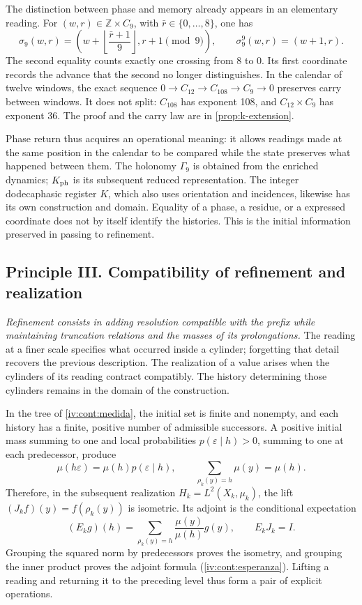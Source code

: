 The distinction between phase and memory already appears in an elementary reading.
For \((w,r)\in\mathbb Z\times C_9\), with
\(\bar r\in\{0,\ldots,8\}\), one has
\[
 \sigma_9(w,r)=
 \left(w+\left\lfloor\frac{\bar r+1}{9}\right\rfloor,
       r+1\pmod9\right),\qquad
 \sigma_9^9(w,r)=(w+1,r).
\]
The second equality counts exactly one crossing from 8 to 0. Its first
coordinate records the advance that the second no longer distinguishes. In the
calendar of twelve windows, the exact sequence
\(0\to C_{12}\to C_{108}\to C_9\to0\) preserves carry between
windows. It does not split: \(C_{108}\) has exponent 108, and
\(C_{12}\times C_9\) has exponent 36. The proof and the carry law are
in \cref{prop:k-extension}.

Phase return thus acquires an operational meaning: it allows
readings made at the same position in the calendar to be compared while
the state preserves what happened between them. The holonomy \(\Gamma_9\)
is obtained from the enriched dynamics; \(K_{\rm ph}\) is its subsequent
reduced representation. The integer dodecaphasic register \(K\), which also uses
orientation and incidences, likewise has its own construction and
domain. Equality of a phase, a residue, or a expressed coordinate
does not by itself identify the histories. This is the initial information
preserved in passing to refinement.

\subsection*{Principle III. Compatibility of refinement and realization}
\hypertarget{prinh:refinamiento}{}

\emph{Refinement consists in adding resolution compatible with the prefix
while maintaining truncation relations and the masses of its prolongations.}
The reading at a finer scale specifies what occurred inside a
cylinder; forgetting that detail recovers the previous description.
The realization of a value arises when the cylinders of its reading
contract compatibly. The history determining those cylinders
remains in the domain of the construction.

In the tree of \cref{iv:cont:medida}, the initial set is finite and
nonempty, and each history has a finite, positive number of admissible
successors. A positive initial mass summing to one and local probabilities
\(p(\varepsilon\mid h)>0\), summing to one at each predecessor, produce
\[
 \mu(h\varepsilon)=\mu(h)p(\varepsilon\mid h),\qquad
 \sum_{\rho_k(y)=h}\mu(y)=\mu(h).
\]
Therefore, in the subsequent realization
\(H_k=L^2(X_k,\mu_k)\), the lift
\((J_kf)(y)=f(\rho_k(y))\) is isometric. Its adjoint is the conditional
expectation
\[
 (E_kg)(h)=\sum_{\rho_k(y)=h}
                  \frac{\mu(y)}{\mu(h)}g(y),
 \qquad E_kJ_k=I.
\]
Grouping the squared norm by predecessors proves the isometry, and grouping the
inner product proves the adjoint formula
(\cref{iv:cont:esperanza}). Lifting a reading and returning it
to the preceding level thus form a pair of explicit operations.

